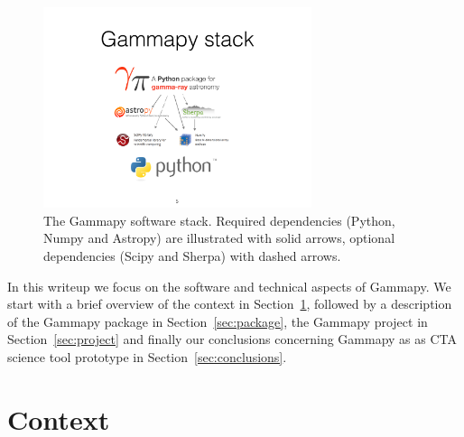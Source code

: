 \documentclass{PoS}
\begin{document}
\begin{figure}[t]
\centering
\includegraphics[width=0.7\textwidth]{figures/gammapy-stack}
\caption{
The Gammapy software stack. Required dependencies (Python, Numpy and Astropy)
are illustrated with solid arrows, optional dependencies (Scipy and Sherpa) with
dashed arrows.
}
\label{fig:stack}
\end{figure}

In this writeup we focus on the software and technical aspects of Gammapy. We
start with a brief overview of the context in Section~\ref{sec:context},
followed by a description of the Gammapy package in Section~\ref{sec:package},
the Gammapy project in Section~\ref{sec:project} and finally our conclusions
concerning Gammapy as as CTA science tool prototype in
Section~\ref{sec:conclusions}.

\section{Context}
\label{sec:context}
\end{document}
